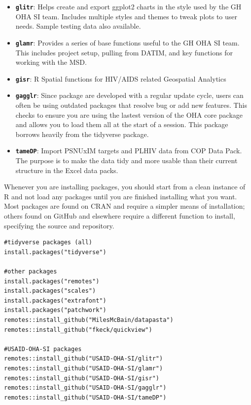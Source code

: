 \documentclass[
  letterpaper,
  DIV=11,
  numbers=noendperiod]{scrreprt}
\providecommand{\tightlist}{%
  \setlength{\itemsep}{0pt}\setlength{\parskip}{0pt}}\usepackage{longtable,booktabs,array}
\begin{document}
\begin{itemize}
\tightlist
\item
  \textbf{\texttt{glitr}}: Helps create and export ggplot2 charts in the
  style used by the GH OHA SI team. Includes multiple styles and themes
  to tweak plots to user needs. Sample testing data also available.
\item
  \textbf{\texttt{glamr}}: Provides a series of base functions useful to
  the GH OHA SI team. This includes project setup, pulling from DATIM,
  and key functions for working with the MSD.
\item
  \textbf{\texttt{gisr}}: R Spatial functions for HIV/AIDS related
  Geospatial Analytics
\item
  \textbf{\texttt{gagglr}}: Since package are developed with a regular
  update cycle, users can often be using outdated packages that resolve
  bug or add new features. This checks to ensure you are using the
  lastest version of the OHA core package and allows you to load them
  all at the start of a session. This package borrows heavily from the
  tidyverse package.
\item
  \textbf{\texttt{tameDP}}: Import PSNUxIM targets and PLHIV data from
  COP Data Pack. The purpose is to make the data tidy and more usable
  than their current structure in the Excel data packs.
\end{itemize}

Whenever you are installing packages, you should start from a clean
instance of R and not load any packages until you are finished
installing what you want. Most packages are found on CRAN and require a
simpler means of installation; others found on GitHub and elsewhere
require a different function to install, specifying the source and
repository.

\begin{verbatim}
#tidyverse packages (all)
install.packages("tidyverse")

#other packages
install.packages("remotes")
install.packages("scales")
install.packages("extrafont")
install.packages("patchwork")
remotes::install_github("MilesMcBain/datapasta")
remotes::install_github("fkeck/quickview")

#USAID-OHA-SI packages
remotes::install_github("USAID-OHA-SI/glitr")
remotes::install_github("USAID-OHA-SI/glamr")
remotes::install_github("USAID-OHA-SI/gisr")
remotes::install_github("USAID-OHA-SI/gagglr")
remotes::install_github("USAID-OHA-SI/tameDP")
\end{verbatim}
\end{document}
